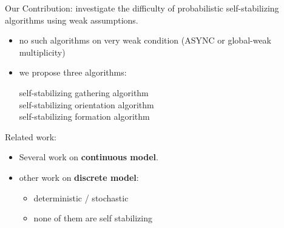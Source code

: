 \documentclass{beamer}
\begin{document}
\begin{frame}
	Our Contribution: investigate the difficulty of probabilistic self-stabilizing algorithms 
	using weak assumptions.
	\begin{itemize}
		\pause
		\item no such algorithms on very weak condition (ASYNC or global-weak multiplicity)
		\pause
		\item we propose three algorithms:
		\begin{description}
			\item[self-stabilizing gathering algorithm]
			\item[self-stabilizing orientation algorithm]
			\item[self-stabilizing formation algorithm]
		\end{description}  
	\end{itemize}
\end{frame}

\begin{frame}
	Related work:
	\begin{itemize}
		\pause
		\item Several work on \textbf{continuous model}. 
		\pause
		\item other work on \textbf{discrete model}:
		\begin{itemize}
			\pause
			\item deterministic / stochastic
			\pause
			\item none of them are self stabilizing
		\end{itemize}
	\end{itemize}
\end{frame}
\end{document}
